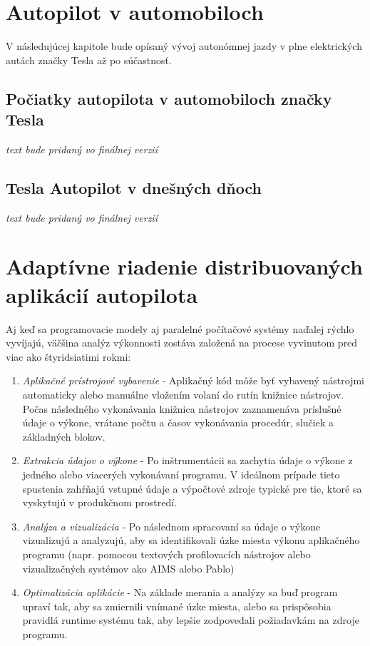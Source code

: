 \documentclass[10pt,twoside,slovak,a4paper]{article}
\begin{document}
\section{Autopilot v automobiloch}

V následujúcej kapitole bude opísaný vývoj autonómnej jazdy v plne elektrických autách značky Tesla až po súčastnosť.

\subsection{Počiatky autopilota v automobiloch značky Tesla} \label{PAVAZ}

\emph{text bude pridaný vo finálnej verzií}

\subsection{Tesla Autopilot v dnešných dňoch}

\emph{text bude pridaný vo finálnej verzií}

\section{Adaptívne riadenie distribuovaných aplikácií autopilota} \label{ARDAA}

Aj keď sa programovacie modely aj paralelné počítačové systémy naďalej rýchlo vyvíjajú, väčšina analýz výkonnosti zostáva založená na procese vyvinutom pred viac ako štyridsiatimi rokmi:

\begin{enumerate}
\item \emph{Aplikačné prístrojové vybavenie} - Aplikačný kód môže byť vybavený nástrojmi automaticky alebo manuálne vložením volaní do rutín knižnice nástrojov. Počas následného vykonávania knižnica nástrojov zaznamenáva príslušné údaje o výkone, vrátane počtu a časov vykonávania procedúr, slučiek a základných blokov.
\item\emph{Extrakcia údajov o výkone} - Po inštrumentácii sa zachytia údaje o výkone z jedného alebo viacerých vykonávaní programu. V ideálnom prípade tieto spustenia zahŕňajú vstupné údaje a výpočtové zdroje typické pre tie, ktoré sa vyskytujú v produkčnom prostredí.
\item\emph{Analýza a vizualizácia} - Po následnom spracovaní sa údaje o výkone vizualizujú a analyzujú, aby sa identifikovali úzke miesta výkonu aplikačného programu (napr. pomocou textových profilovacích nástrojov alebo vizualizačných systémov ako AIMS  alebo Pablo)
\item\emph{Optimalizácia aplikácie} - Na základe merania a analýzy sa buď program upraví tak, aby sa zmiernili vnímané úzke miesta, alebo sa prispôsobia pravidlá runtime systému tak, aby lepšie zodpovedali požiadavkám na zdroje programu. \cite{SoftverAutopilot}
\end{enumerate}
\end{document}
